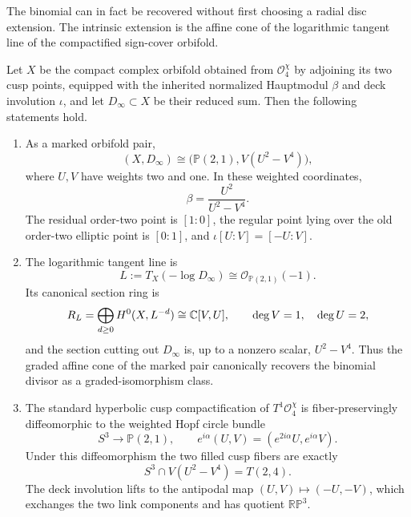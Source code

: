 The binomial can in fact be recovered without first choosing a radial disc
extension.  The intrinsic extension is the affine cone of the logarithmic tangent
line of the compactified sign-cover orbifold.

\begin{theorem}[The q=4 logarithmic tangent cone]
\label{thm:q4-logarithmic-tangent-cone}
Let $X$ be the compact complex orbifold obtained from
$\mathcal O_4^\chi$ by adjoining its two cusp points, equipped with the
inherited normalized Hauptmodul $\beta$ and deck involution $\iota$, and let
$D_\infty\subset X$ be their reduced sum.  Then the following statements hold.
\begin{enumerate}
\item As a marked orbifold pair,
  \begin{equation}
   (X,D_\infty)
   \cong
   \bigl(\mathbb P(2,1),V(U^2-V^4)\bigr),
   \label{eq:q4-weighted-orbifold-pair}
  \end{equation}
  where $U,V$ have weights two and one.  In these weighted coordinates,
  \begin{equation}
   \beta=\frac{U^2}{U^2-V^4}.
   \label{eq:q4-weighted-hauptmodul}
  \end{equation}
  The residual order-two point is $[1:0]$, the regular point lying over the old
  order-two elliptic point is $[0:1]$, and $\iota[U:V]=[-U:V]$.
\item The logarithmic tangent line is
  \begin{equation}
   L:=T_X(-\log D_\infty)\cong\mathcal O_{\mathbb P(2,1)}(-1).
   \label{eq:q4-log-tangent-line}
  \end{equation}
  Its canonical section ring is
  \begin{equation}
   R_L=\bigoplus_{d\ge0}H^0(X,L^{-d})
   \cong\mathbb{C}[V,U],
   \qquad \deg V=1,\quad\deg U=2,
   \label{eq:q4-log-tangent-section-ring}
  \end{equation}
  and the section cutting out $D_\infty$ is, up to a nonzero scalar,
  $U^2-V^4$.  Thus the graded affine cone of the marked pair canonically
  recovers the binomial divisor as a graded-isomorphism class.
\item The standard hyperbolic cusp compactification of
  $T^1\mathcal O_4^\chi$ is fiber-preservingly diffeomorphic to the weighted
  Hopf circle bundle
  \begin{equation}
   S^3\longrightarrow\mathbb P(2,1),
   \qquad
   e^{i\alpha}(U,V)=(e^{2i\alpha}U,e^{i\alpha}V).
   \label{eq:q4-weighted-hopf-fibration}
  \end{equation}
  Under this diffeomorphism the two filled cusp fibers are exactly
  \begin{equation}
   S^3\cap V(U^2-V^4)=T(2,4).
   \label{eq:q4-weighted-polynomial-link}
  \end{equation}
  The deck involution lifts to the antipodal map
  $(U,V)\mapsto(-U,-V)$, which exchanges the two link components and has
  quotient $\mathbb {RP}^3$.
\end{enumerate}
\end{theorem}


